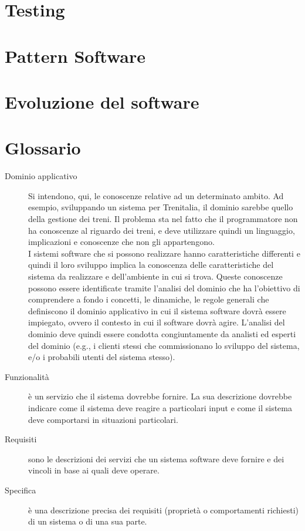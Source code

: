 \documentclass{article}
\begin{document}
	\section{Testing}
	\section{Pattern Software}
	\section{Evoluzione del software}
	\section{Glossario}
	\begin{description}
		\item[Dominio applicativo] Si intendono, qui, le conoscenze relative ad un determinato ambito. Ad esempio, sviluppando un sistema per Trenitalia, il dominio
		sarebbe quello della gestione dei treni. Il problema sta nel fatto che il programmatore non ha conoscenze al riguardo dei treni, e deve utilizzare quindi un linguaggio, implicazioni e conoscenze che non gli appartengono. \\
		I sistemi software che si possono realizzare hanno
		caratteristiche differenti e quindi il loro sviluppo implica la conoscenza
		delle caratteristiche del sistema da realizzare e dell’ambiente in cui si trova.
		Queste conoscenze possono essere identificate tramite l'analisi del
		dominio che ha l’obiettivo di comprendere a fondo i concetti, le dinamiche,
		le regole generali che definiscono il dominio applicativo in cui il sistema
		software dovrà essere impiegato, ovvero il contesto in cui il software dovrà
		agire. L'analisi del dominio deve quindi essere condotta congiuntamente
		da analisti ed esperti del dominio (e.g., i clienti stessi che commissionano
		lo sviluppo del sistema, e/o i probabili utenti del sistema stesso).
		\item[Funzionalità] è un servizio che il sistema dovrebbe fornire. La sua
		descrizione dovrebbe indicare come il sistema deve reagire a particolari
		input e come il sistema deve comportarsi in situazioni particolari.
		\item[Requisiti] sono le descrizioni dei servizi che un sistema software deve
		fornire e dei vincoli in base ai quali deve operare.
		\item[Specifica] è una descrizione precisa dei requisiti (proprietà o
		comportamenti richiesti) di un sistema o di una sua parte.

\end{description}
\end{document}
